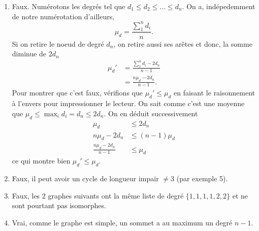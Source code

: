 \begin{solution}
  \begin{enumerate}
    \item Faux.
      Numérotons les degrés tel que $d_{1} \leq d_{2} \leq \ldots \leq d_{n}$.
      On a, indépedemment de notre numérotation d'ailleurs,
      \[ \mu_d = \frac{\sum_{1}^{n} d_{i}}{n}. \]
      Si on retire le noeud de degré $d_{n}$, on retire aussi ses arêtes et donc,
      la somme diminue de $2d_n$
      \begin{align*}
        \mu_d' & = \frac{\sum_{1}^{n} d_{i} -2d_{n}}{n-1}\\
               & = \frac{n\mu_d - 2d_n}{n-1}.
      \end{align*}
      Pour montrer que c'est faux,
      vérifions que $\mu_d' \leq \mu_d$ en faisant le raisonnement à l'envers pour
      impressionner le lecteur.
      On sait comme c'est une moyenne que $\mu_d \leq \max_i d_i = d_n \leq 2d_n$.
      On en déduit successivement
      \begin{align*}
        \mu_d & \leq 2d_n\\
        n\mu_d - 2d_n & \leq (n-1) \mu_d\\
        \frac{n\mu_d - 2d_n}{n-1} & \leq \mu_d
      \end{align*}
      ce qui montre bien $\mu_d' \leq \mu_d$.
    \item Faux, il peut avoir un cycle de longueur impair $\neq 3$ (par exemple 5).
    \item Faux, les 2 graphes suivants ont la même liste de degré $\{1,1,1,1,2,2\}$
      et ne sont pourtant pas isomorphes.
      \begin{center}
        \hspace{3cm}
      \end{center}
    \item Vrai, comme le graphe est simple,
      un sommet a au maximum un degré $n-1$.


\end{enumerate}
\end{solution}
